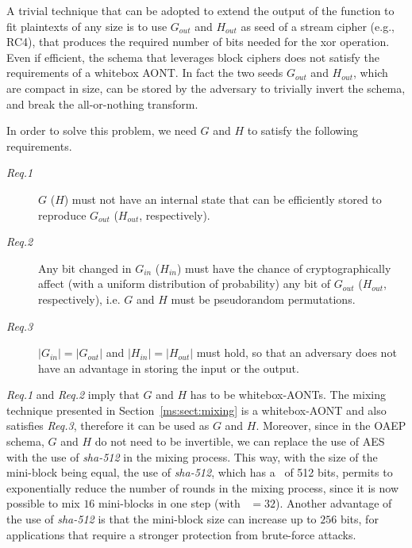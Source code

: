 {A trivial technique that can be adopted to extend the output of the function to fit plaintexts of any size is to use $G_{out}$ and $H_{out}$ as seed of a stream cipher (e.g., RC4), that produces the required number of bits needed for the xor operation.
Even if efficient, the schema that leverages block ciphers does not satisfy the requirements of a whitebox AONT. In fact the two seeds $G_{out}$ and $H_{out}$, which are compact in size, can be stored by the adversary to trivially invert the schema, and break the all-or-nothing transform.

In order to solve this problem, we need $G$ and $H$ to satisfy the following requirements.
\vspace{1ex}

\begin{description}
	\item [{\em Req.1}] \hspace{1ex} $G$ ($H$) must not have an internal state that can be efficiently stored to reproduce $G_{out}$ ($H_{out}$, respectively).
	\item [{\em Req.2}] \hspace{1ex} Any bit changed in $G_{in}$ ($H_{in}$) must have the chance of cryptographically affect (with a uniform distribution of probability) any bit of $G_{out}$ ($H_{out}$, respectively), i.e. $G$ and $H$ must be pseudorandom permutations.
	\item [{\em Req.3}] \hspace{1ex} $|G_{in}| = |G_{out}|$ and $|H_{in}| = |H_{out}|$ must hold, so that an adversary does not have an advantage in storing the input or the output.
\end{description}
\vspace{1ex}

{\em Req.1} and {\em Req.2} imply that $G$ and $H$ has to be whitebox-AONTs. The mixing technique presented in Section~\ref{ms:sect:mixing} is a whitebox-AONT and also satisfies {\em Req.3}, therefore it can be used as $G$ and $H$.
Moreover, since in the OAEP schema, $G$ and $H$ do not need to be invertible, we can replace the use of AES with the use of {\em sha-512} in the mixing process. This way, with the size of the mini-block being equal, the use of {\em sha-512}, which has a \bsize\ of 512 bits, permits to exponentially reduce the number of rounds in the mixing process, since it is now possible to mix $16$ mini-blocks in one step (with \msize\ $= 32$).
Another advantage of the use of {\em sha-512} is that the mini-block size can increase up to $256$ bits, for applications that require a stronger protection from brute-force attacks.

}
